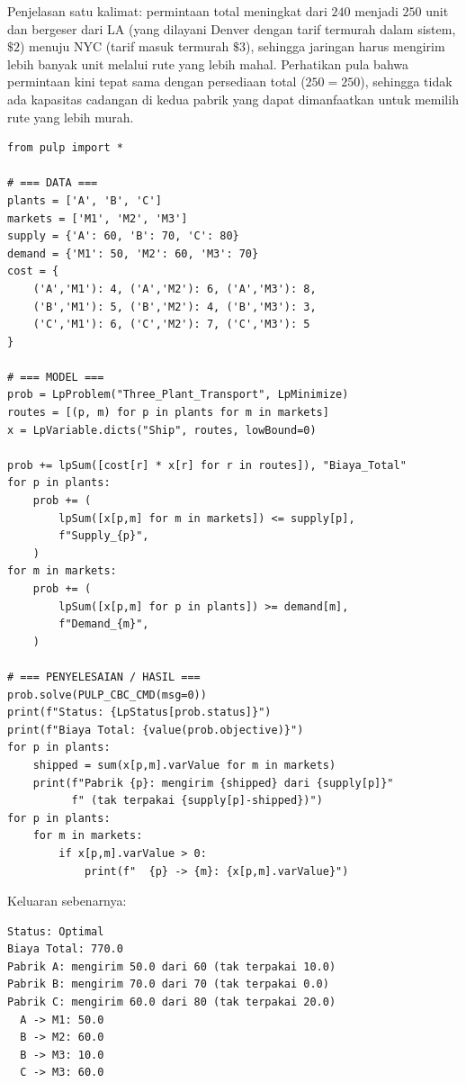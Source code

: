 Penjelasan satu kalimat: permintaan total meningkat dari $240$ menjadi $250$
unit dan bergeser dari LA (yang dilayani Denver dengan tarif termurah dalam
sistem, $\$2$) menuju NYC (tarif masuk termurah $\$3$), sehingga jaringan
harus mengirim lebih banyak unit melalui rute yang lebih mahal. Perhatikan
pula bahwa permintaan kini tepat sama dengan persediaan total ($250 = 250$),
sehingga tidak ada kapasitas cadangan di kedua pabrik yang dapat dimanfaatkan
untuk memilih rute yang lebih murah.


\begin{verbatim}
from pulp import *

# === DATA ===
plants = ['A', 'B', 'C']
markets = ['M1', 'M2', 'M3']
supply = {'A': 60, 'B': 70, 'C': 80}
demand = {'M1': 50, 'M2': 60, 'M3': 70}
cost = {
    ('A','M1'): 4, ('A','M2'): 6, ('A','M3'): 8,
    ('B','M1'): 5, ('B','M2'): 4, ('B','M3'): 3,
    ('C','M1'): 6, ('C','M2'): 7, ('C','M3'): 5
}

# === MODEL ===
prob = LpProblem("Three_Plant_Transport", LpMinimize)
routes = [(p, m) for p in plants for m in markets]
x = LpVariable.dicts("Ship", routes, lowBound=0)

prob += lpSum([cost[r] * x[r] for r in routes]), "Biaya_Total"
for p in plants:
    prob += (
        lpSum([x[p,m] for m in markets]) <= supply[p],
        f"Supply_{p}",
    )
for m in markets:
    prob += (
        lpSum([x[p,m] for p in plants]) >= demand[m],
        f"Demand_{m}",
    )

# === PENYELESAIAN / HASIL ===
prob.solve(PULP_CBC_CMD(msg=0))
print(f"Status: {LpStatus[prob.status]}")
print(f"Biaya Total: {value(prob.objective)}")
for p in plants:
    shipped = sum(x[p,m].varValue for m in markets)
    print(f"Pabrik {p}: mengirim {shipped} dari {supply[p]}"
          f" (tak terpakai {supply[p]-shipped})")
for p in plants:
    for m in markets:
        if x[p,m].varValue > 0:
            print(f"  {p} -> {m}: {x[p,m].varValue}")
\end{verbatim}

Keluaran sebenarnya:

\begin{verbatim}
Status: Optimal
Biaya Total: 770.0
Pabrik A: mengirim 50.0 dari 60 (tak terpakai 10.0)
Pabrik B: mengirim 70.0 dari 70 (tak terpakai 0.0)
Pabrik C: mengirim 60.0 dari 80 (tak terpakai 20.0)
  A -> M1: 50.0
  B -> M2: 60.0
  B -> M3: 10.0
  C -> M3: 60.0
\end{verbatim}

